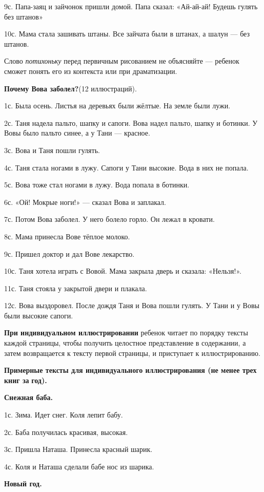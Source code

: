 \documentclass[a5paper]{book}
\renewcommand{\emph}[1]{\textit{#1}}
\begin{document}
9с. Папа-заяц и зайчонок пришли домой. Папа сказал: «Ай-ай-ай! Будешь
гулять без штанов»

10с. Мама стала зашивать штаны. Все зайчата были в штанах, а шалун ---
без штанов.

Слово \emph{потихоньку} перед первичным рисованием не объясняйте ---
ребенок сможет понять его из контекста или при драматизации.

\textbf{Почему Вова заболел?}(12 иллюстраций).

1с. Была осень. Листья на деревьях были жёлтые. На земле были лужи.

2с. Таня надела пальто, шапку и сапоги. Вова надел пальто, шапку и
ботинки. У Вовы было пальто синее, а у Тани --- красное.

3с. Вова и Таня пошли гулять.

4с. Таня стала ногами в лужу. Сапоги у Тани высокие. Вода в них не
попала.

5с. Вова тоже стал ногами в лужу. Вода попала в ботинки.

6с. «Ой! Мокрые ноги!» --- сказал Вова и заплакал.

7с. Потом Вова заболел. У него болело горло. Он лежал в кровати.

8с. Мама принесла Вове тёплое молоко.

9с. Пришел доктор и дал Вове лекарство.

10с. Таня хотела играть с Вовой. Мама закрыла дверь и сказала:
«Нельзя!».

11с. Таня стояла у закрытой двери и плакала.

12с. Вова выздоровел. После дождя Таня и Вова пошли гулять. У Тани и у
Вовы были высокие сапоги.

\textbf{При индивидуальном иллюстрировании} ребенок читает по порядку
тексты каждой страницы, чтобы получить целостное представление в
содержании, а затем возвращается к тексту первой страницы, и приступает
к иллюстрированию.

\textbf{Примерные тексты для индивидуального иллюстрирования (не менее
трех книг за} \textbf{год).}

\textbf{Снежная баба.}

1с. Зима. Идет снег. Коля лепит бабу.

2с. Баба получилась красивая, высокая.

3с. Пришла Наташа. Принесла красный шарик.

4с. Коля и Наташа сделали бабе нос из шарика.

\textbf{Новый год.}
\end{document}

